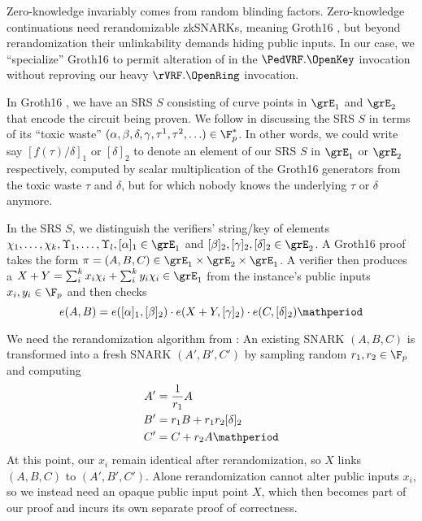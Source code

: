 Zero-knowledge invariably comes from random blinding factors.
Zero-knowledge continuations need rerandomizable zkSNARKs,
meaning Groth16 \cite{Groth16}, but beyond rerandomization their
unlinkability demands hiding public inputs.
In our case, we ``specialize'' Groth16 to permit alteration of \openpk
in the $\PedVRF.\OpenKey$ invocation without reproving our heavy
$\rVRF.\OpenRing$ invocation.

In Groth16 \cite{Groth16}, we have an SRS $S$ consisting of curve
points in $\grE_1$ and $\grE_2$ that encode the circuit being proven.
We follow \cite{Groth16} in discussing the SRS $S$ in terms of
its ``toxic waste''
 $(\alpha,\beta,\delta,\gamma,\tau^1,\tau^2,\ldots) \in \F_p^*$.
In other words, we could write say $[ f(\tau)/\delta ]_1$ or $[\delta]_2$
to denote an element of our SRS $S$ in $\grE_1$ or $\grE_2$ respectively,
computed by scalar multiplication of the Groth16 generators from
the toxic waste $\tau$ and $\delta$,
 but for which nobody knows the underlying $\tau$ or $\delta$ anymore.

In the SRS $S$, we distinguish the verifiers' string/key of elements
 $\chi_1,\ldots,\chi_k, \Upsilon_1,\ldots,\Upsilon_l, [\alpha]_1 \in \grE_1$ and
 $[\beta]_2, [\gamma]_2, [\delta]_2 \in \grE_2$.
A Groth16 \cite{Groth16} proof takes the form 
 $\pi = (A,B,C) \in \grE_1 \times \grE_2 \times \grE_1$.
A verifier then produces a $X+Y = \sum_i^k x_i \chi_i + \sum_i^k y_i \chi_i \in \grE_1$
 from the instance's public inputs $x_i,y_i \in \F_p$ and then checks 
$$ e(A,B) = e([\alpha]_1, [\beta]_2) \cdot
 e(X+Y, [\gamma]_2) \cdot e(C, [\delta]_2) \mathperiod $$

We need the rerandomization algorithm from \cite[Fig.~1]{RandomizationGroth16}:
An existing SNARK $(A,B,C)$ is transformed into a fresh
SNARK $(A',B',C')$ by sampling random $r_1,r_2 \in \F_p$ and computing
$$ \begin{aligned}
A' &= {1 \over r_1} A \\
B' &= r_1 B + r_1 r_2 [\delta]_2 \\
C' &= C + r_2 A \mathperiod \\
\end{aligned} $$
At this point, our $x_i$ remain identical after rerandomization,
so $X$ links $(A,B,C)$ to $(A',B',C')$.
Alone rerandomization cannot alter public inputs $x_i$, so
we instead need an opaque public input point $X$, which then becomes
part of our proof and incurs its own separate proof of correctness.

